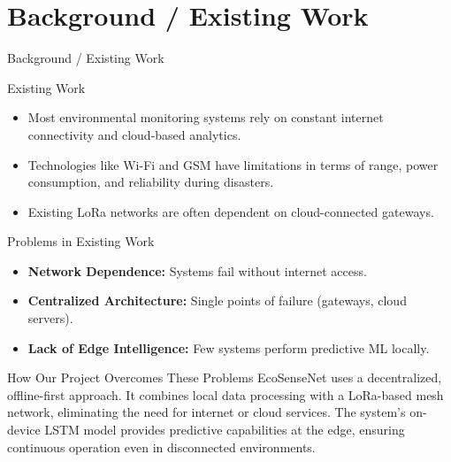 \documentclass{beamer}
\begin{document}
\section{Background / Existing Work}
\begin{frame}{Background / Existing Work}
  \begin{block}{Existing Work}
    \begin{itemize}
      \item Most environmental monitoring systems rely on constant internet connectivity and cloud-based analytics.
      \item Technologies like Wi-Fi and GSM have limitations in terms of range, power consumption, and reliability during disasters.
      \item Existing LoRa networks are often dependent on cloud-connected gateways.
    \end{itemize}
  \end{block}
  \begin{block}{Problems in Existing Work}
    \begin{itemize}
      \item \textbf{Network Dependence:} Systems fail without internet access.
      \item \textbf{Centralized Architecture:} Single points of failure (gateways, cloud servers).
      \item \textbf{Lack of Edge Intelligence:} Few systems perform predictive ML locally.
    \end{itemize}
  \end{block}
  \begin{block}{How Our Project Overcomes These Problems}
    EcoSenseNet uses a decentralized, offline-first approach. It combines local data processing with a LoRa-based mesh network, eliminating the need for internet or cloud services. The system's on-device LSTM model provides predictive capabilities at the edge, ensuring continuous operation even in disconnected environments.
  \end{block}
\end{frame}
\end{document}
